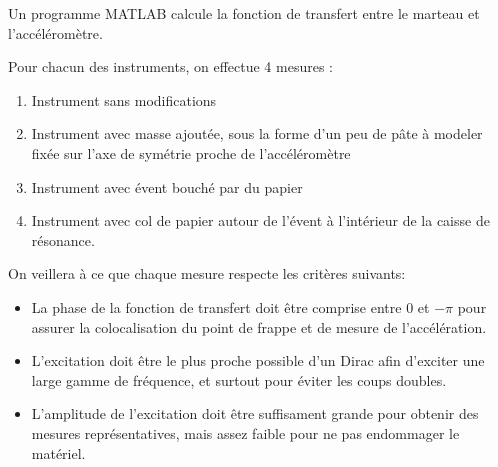 \documentclass[atiam, article]{rapport} %
\begin{document}
Un programme MATLAB calcule la fonction de transfert entre le marteau et l'accéléromètre.

Pour chacun des instruments, on effectue 4 mesures :
\begin{enumerate}
    \item Instrument sans modifications
    \item Instrument avec masse ajoutée, sous la forme d'un peu de pâte à modeler fixée sur l'axe de symétrie proche de l'accéléromètre
    \item Instrument avec évent bouché par du papier
    \item Instrument avec col de papier autour de l'évent à l'intérieur de la caisse de résonance.
\end{enumerate}

On veillera à ce que chaque mesure respecte les critères suivants:

\begin{itemize}
    \item La phase de la fonction de transfert doit être comprise entre $0$ et $-\pi$ pour assurer la colocalisation du point de frappe et de mesure de l'accélération.
    \item L'excitation doit être le plus proche possible d'un Dirac afin d'exciter une large gamme de fréquence, et surtout pour éviter les coups doubles.\item L'amplitude de l'excitation doit être suffisament grande pour obtenir des mesures représentatives, mais assez faible pour ne pas endommager le matériel.
\end{itemize}

\printbibliography
\end{document}
